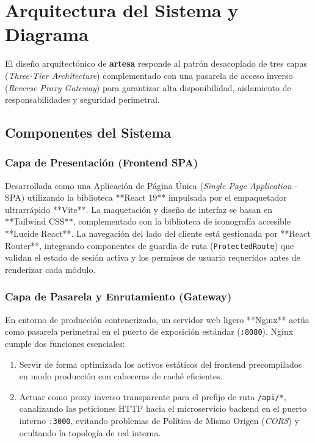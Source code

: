 \section{Arquitectura del Sistema y Diagrama}
\label{sec:arquitectura}

El diseño arquitectónico de \textbf{artesa} responde al patrón desacoplado de tres capas (\textit{Three-Tier Architecture}) complementado con una pasarela de acceso inverso (\textit{Reverse Proxy Gateway}) para garantizar alta disponibilidad, aislamiento de responsabilidades y seguridad perimetral.

\subsection{Componentes del Sistema}

\subsubsection{Capa de Presentación (Frontend SPA)}
Desarrollada como una Aplicación de Página Única (\textit{Single Page Application} - SPA) utilizando la biblioteca **React 19** impulsada por el empaquetador ultrarrápido **Vite**. La maquetación y diseño de interfaz se basan en **Tailwind CSS**, complementado con la biblioteca de iconografía accesible **Lucide React**. La navegación del lado del cliente está gestionada por **React Router**, integrando componentes de guardia de ruta (\texttt{ProtectedRoute}) que validan el estado de sesión activa y los permisos de usuario requeridos antes de renderizar cada módulo.

\subsubsection{Capa de Pasarela y Enrutamiento (Gateway)}
En entorno de producción contenerizado, un servidor web ligero **Nginx** actúa como pasarela perimetral en el puerto de exposición estándar (\texttt{:8080}). Nginx cumple dos funciones esenciales:
\begin{enumerate}
    \item Servir de forma optimizada los activos estáticos del frontend precompilados en modo producción con cabeceras de caché eficientes.
    \item Actuar como proxy inverso transparente para el prefijo de ruta \texttt{/api/*}, canalizando las peticiones HTTP hacia el microservicio backend en el puerto interno \texttt{:3000}, evitando problemas de Política de Mismo Origen (\textit{CORS}) y ocultando la topología de red interna.
\end{enumerate}

